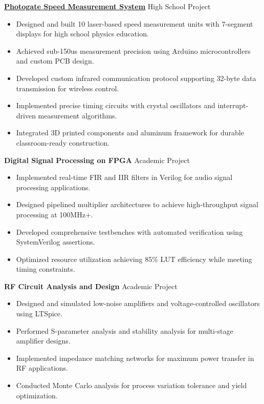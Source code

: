 \documentclass[letterpaper,10pt]{article}
\begin{document}
\vspace{0.2cm}
\noindent\href{https://github.com/Ken-2511/Photogate}{\uline{
\textbf{Photogate Speed Measurement System}}} \hfill High School Project
\begin{itemize}[leftmargin=0.2in]
    \item Designed and built 10 laser-based speed measurement units with 7-segment displays for high school physics education.
    \item Achieved sub-150us measurement precision using Arduino microcontrollers and custom PCB design.
    \item Developed custom infrared communication protocol supporting 32-byte data transmission for wireless control.
    \item Implemented precise timing circuits with crystal oscillators and interrupt-driven measurement algorithms.
    \item Integrated 3D printed components and aluminum framework for durable classroom-ready construction.
\end{itemize}

\vspace{0.2cm}
\noindent\textbf{Digital Signal Processing on FPGA} \hfill Academic Project
\begin{itemize}[leftmargin=0.2in]
    \item Implemented real-time FIR and IIR filters in Verilog for audio signal processing applications.
    \item Designed pipelined multiplier architectures to achieve high-throughput signal processing at 100MHz+.
    \item Developed comprehensive testbenches with automated verification using SystemVerilog assertions.
    \item Optimized resource utilization achieving 85\% LUT efficiency while meeting timing constraints.
\end{itemize}

\vspace{0.2cm}
\noindent\textbf{RF Circuit Analysis and Design} \hfill Academic Project
\begin{itemize}[leftmargin=0.2in]
    \item Designed and simulated low-noise amplifiers and voltage-controlled oscillators using LTSpice.
    \item Performed S-parameter analysis and stability analysis for multi-stage amplifier designs.
    \item Implemented impedance matching networks for maximum power transfer in RF applications.
    \item Conducted Monte Carlo analysis for process variation tolerance and yield optimization.
\end{itemize}
\end{document}
